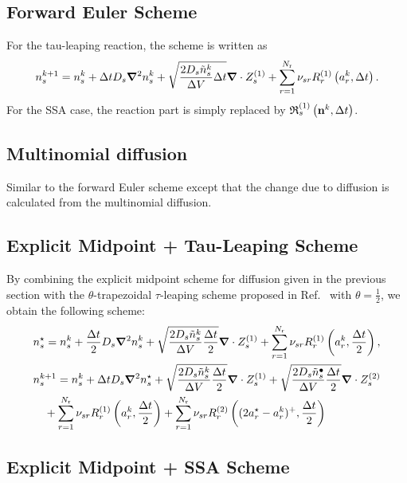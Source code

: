 \documentclass[final]{siamltex}
\newcommand{\nb}{\mathbf{n}}
\begin{document}
\subsection{Forward Euler Scheme}

For the tau-leaping reaction, the scheme is written as
\begin{equation}
n_s^{k+1} = n_s^k + {\Delta t}{D_s}\bm{\nabla}^2n_s^k
+\sqrt{\frac{2{D_s}\tilde{n}_s^k}{{\Delta V}}{\Delta t}} \bm{\nabla}\cdot Z_s^{(1)}
+\sum_{r=1}^{N_\mathrm{r}} {\nu_{s r}} R_r^{(1)}\left(a_r^k,{\Delta t}\right).
\end{equation}
For the SSA case, the reaction part is simply replaced by $\Rfrak_s^\pone\left(\nb^k,\dt\right)$.

\subsection{Multinomial diffusion}

Similar to the forward Euler scheme except that the change due to diffusion is calculated from the multinomial diffusion.  

\subsection{Explicit Midpoint + Tau-Leaping Scheme}

By combining the explicit midpoint scheme for diffusion given in the previous section
with the $\theta$-trapezoidal $\tau$-leaping scheme proposed in Ref.~\cite{HuLiMin2011} with $\theta=\frac{1}{2}$,
we obtain the following scheme:
\begin{subequations}
\begin{align}
&n_s^\star = n_s^k + {\frac{{\Delta t}}{2}}{D_s}\bm{\nabla}^2n_s^k 
+\sqrt{\frac{2{D_s}\tilde{n}_s^k}{{\Delta V}}{\frac{{\Delta t}}{2}}} \bm{\nabla}\cdot Z_s^{(1)}
+\sum_{r=1}^{N_\mathrm{r}} {\nu_{s r}} R_r^{(1)}\left(a_r^k,{\frac{{\Delta t}}{2}}\right),\\
&n_s^{k+1} = n_s^k + {\Delta t}{D_s}\bm{\nabla}^2n_s^\star
+\sqrt{\frac{2{D_s}\tilde{n}_s^k}{{\Delta V}}{\frac{{\Delta t}}{2}}} \bm{\nabla}\cdot Z_s^{(1)}
+\sqrt{\frac{2{D_s}\tilde{n}_s^\bullet}{{\Delta V}}{\frac{{\Delta t}}{2}}} \bm{\nabla}\cdot Z_s^{(2)}\\
&\quad+\sum_{r=1}^{N_\mathrm{r}} {\nu_{s r}} R_r^{(1)}\left(a_r^k,{\frac{{\Delta t}}{2}}\right)
+\sum_{r=1}^{N_\mathrm{r}} {\nu_{s r}} R_r^{(2)}\left((2a_r^\star-a_r^k)^+,{\frac{{\Delta t}}{2}}\right)\notag
\end{align}
\end{subequations}

\subsection{Explicit Midpoint + SSA Scheme}
\end{document}
